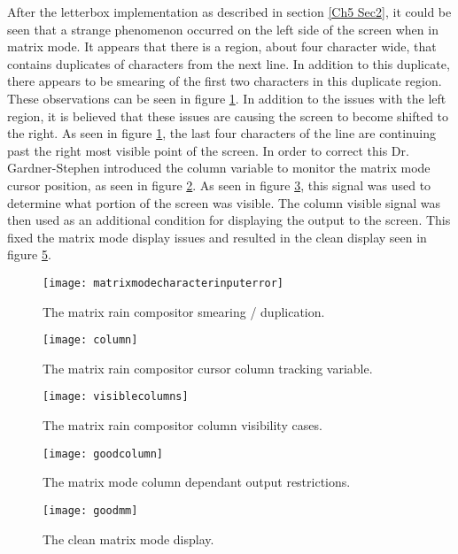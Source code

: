 After the letterbox implementation as described in section \ref{Ch5 Sec2}, it could be seen that a strange phenomenon occurred on the left side of the screen when in matrix mode. It appears that there is a region, about four character wide, that contains duplicates of characters from the next line. In addition to this duplicate, there appears to be smearing of the first two characters in this duplicate region. These observations can be seen in figure \ref{fig:matrixmodecharacterinputerror}. In addition to the issues with the left region, it is believed that these issues are causing the screen to become shifted to the right. As seen in figure \ref{fig:matrixmodecharacterinputerror}, the last four characters of the line are continuing past the right most visible point of the screen. In order to correct this Dr. Gardner-Stephen introduced the column variable to monitor the matrix mode cursor position, as seen in figure \ref{fig:column}. As seen in figure \ref{fig:visiblecolumns}, this signal was used to determine what portion of the screen was visible. The column visible signal was then used as an additional condition for displaying the output to the screen. This fixed the matrix mode display issues and resulted in the clean display seen in figure \ref{fig:goodmm}.

\begin{figure}
  \centering
  \texttt{[image: matrixmodecharacterinputerror]}
  \caption{The matrix rain compositor smearing / duplication.}
  \label{fig:matrixmodecharacterinputerror}
\end{figure}

\begin{figure}
  \centering
  \texttt{[image: column]}
  \caption{The matrix rain compositor cursor column tracking variable.}
  \label{fig:column}
\end{figure}

\begin{figure}
  \centering
  \texttt{[image: visiblecolumns]}
  \caption{The matrix rain compositor column visibility cases.}
  \label{fig:visiblecolumns}
\end{figure}

\begin{figure}
  \centering
  \texttt{[image: goodcolumn]}
  \caption{The matrix mode column dependant output restrictions.}
  \label{fig:goodcolumn}
\end{figure}

\begin{figure}
  \centering
  \texttt{[image: goodmm]}
  \caption{The clean matrix mode display.}
  \label{fig:goodmm}
\end{figure}

